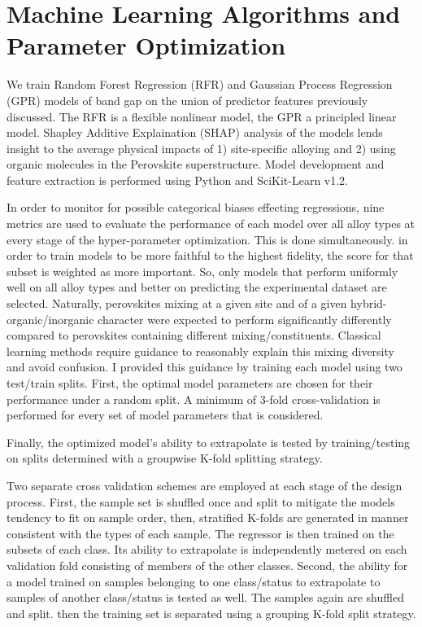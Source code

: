 \section{Machine Learning Algorithms and Parameter Optimization}
\label{sec:orgfa18b00}
We train Random Forest Regression (RFR) and Gaussian Process Regression (GPR) models of band gap on the union of predictor features previously discussed.
The RFR is a flexible nonlinear model, the GPR a principled linear model.
Shapley Additive Explaination (SHAP) analysis of the models lends insight to the average physical impacts of 1) site-specific alloying and 2) using organic molecules in the Perovskite superstructure.
Model development and feature extraction is performed using Python and SciKit-Learn v1.2.
\autocite{pedregosa-2011-scikit-learn} 

In order to monitor for possible categorical biases effecting regressions, nine metrics are used to evaluate the performance of each model over all alloy types at every stage of the hyper-parameter optimization.
This is done simultaneously.
in order to train models to be more faithful to the highest fidelity, the score for that subset is weighted as more important.
So, only models that perform uniformly well on all alloy types and better on predicting the experimental dataset are selected.
Naturally, perovskites mixing at a given site and of a given hybrid-organic/inorganic character were expected to perform significantly differently compared to perovskites containing different mixing/constituents.
Classical learning methods require guidance to reasonably explain this mixing diversity and avoid confusion.
I provided this guidance by training each model using two test/train splits.
First, the optimal model parameters are chosen for their performance under a random split.
A minimum of 3-fold cross-validation is performed for every set of model parameters that is considered.

Finally, the optimized model's ability to extrapolate is
tested by training/testing on splits determined with a groupwise K-fold splitting strategy.

Two separate cross validation schemes are employed at each stage of the design process.
First, the sample set is shuffled once and split to mitigate the models tendency to fit on sample order, then, stratified K-folds are generated in manner consistent with the types of each sample.
The regressor is then trained on the subsets of each class.
Its ability to extrapolate is independently metered on each validation fold consisting of members of the other classes.
Second, the ability for a model trained on samples belonging to one class/status to extrapolate to samples of another class/status is tested as well.
The samples again are shuffled and split.
then the training set is separated using a grouping K-fold split strategy.

